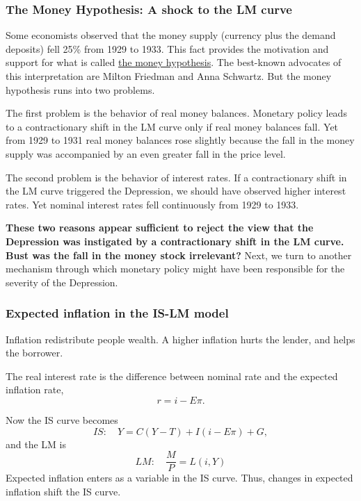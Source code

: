 \documentclass[10pt]{article}
\begin{document}
\subsubsection{The Money Hypothesis: A shock to the LM curve}
Some economists observed that the money supply (currency plus the demand deposits) fell 25\%
from 1929 to 1933. This fact provides the motivation and support for what is called
{\underline {the money hypothesis}}. The best-known advocates of this interpretation are Milton
Friedman and Anna Schwartz. But the money hypothesis runs into two problems.

The first problem is the behavior of real money balances. Monetary policy leads to a contractionary
shift in the LM curve only if real money balances fall. Yet from 1929 to 1931 real money balances
rose slightly because the fall in the money supply was accompanied by an even greater fall in the
price level.

The second problem is the behavior of interest rates. If a contractionary shift in the LM curve
triggered the Depression, we should have observed higher interest rates. Yet nominal interest
rates fell continuously from 1929 to 1933.


{\textbf {These two reasons appear sufficient to reject the view that the Depression
was instigated by a contractionary shift in the LM curve. Bust was the fall in the money stock
irrelevant?}} Next, we turn to another mechanism through which monetary policy might have been
responsible for the severity of the Depression.









\subsubsection{Expected inflation in the IS-LM model}
Inflation redistribute people wealth. A higher inflation hurts the lender,
and helps the borrower.

The real interest rate is the difference between nominal rate and the expected inflation
rate,
\begin{equation*}
r = i - E \pi.
\end{equation*}

Now the IS curve becomes
\begin{equation*}
IS: \quad Y = C(Y - T) + I(i - E \pi) + G,
\end{equation*}
and the LM is 
\begin{equation*}
LM: \quad \frac{M}{P} = L(i, Y)
\end{equation*}
Expected inflation enters as a variable in the IS curve. Thus, changes in expected inflation
shift the IS curve.
\end{document}
